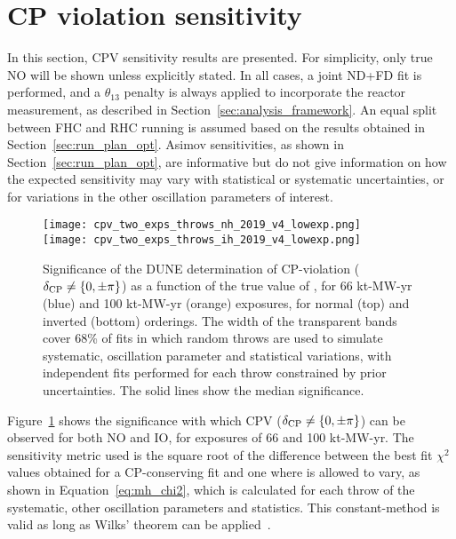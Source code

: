 \FloatBarrier
\section{CP violation sensitivity}
\label{sec:cp_sens}

In this section, CPV sensitivity results are presented. For simplicity, only true NO will be shown unless explicitly stated. In all cases, a joint ND+FD fit is performed, and a $\theta_{13}$ penalty is always applied to incorporate the reactor measurement, as described in Section~\ref{sec:analysis_framework}. An equal split between FHC and RHC running is assumed based on the results obtained in Section~\ref{sec:run_plan_opt}. Asimov sensitivities, as shown in Section~\ref{sec:run_plan_opt}, are informative but do not give information on how the expected sensitivity may vary with statistical or systematic uncertainties, or for variations in the other oscillation parameters of interest.

\begin{figure}[htbp]
  \centering
  \texttt{[image: cpv\_two\_exps\_throws\_nh\_2019\_v4\_lowexp.png]}\\
  \texttt{[image: cpv\_two\_exps\_throws\_ih\_2019\_v4\_lowexp.png]}
  \caption{Significance of the DUNE determination of CP-violation ($\delta_{\rm CP} \neq \{0,\pm\pi\}$) as a function of the true value of \deltacp, for 66 kt-MW-yr (blue) and 100 kt-MW-yr (orange) exposures, for normal (top) and inverted (bottom) orderings. The width of the transparent bands cover 68\% of fits in which random throws are used to simulate systematic, oscillation parameter and statistical variations, with independent fits performed for each throw constrained by prior uncertainties. The solid lines show the median significance.}
  \label{fig:cpv_bands}
\end{figure}
Figure~\ref{fig:cpv_bands} shows the significance with which CPV ($\delta_{\rm CP} \neq \{0,\pm\pi\}$) can be observed for both NO and IO, for exposures of 66 and 100 kt-MW-yr.  The sensitivity metric used is the square root of the difference between the best fit $\chi^{2}$ values obtained for a CP-conserving fit and one where \deltacp is allowed to vary, as shown in Equation~\ref{eq:mh_chi2}, which is calculated for each throw of the systematic, other oscillation parameters and statistics. This constant-\dchisq method is valid as long as Wilks' theorem can be applied~\cite{wilks}.

